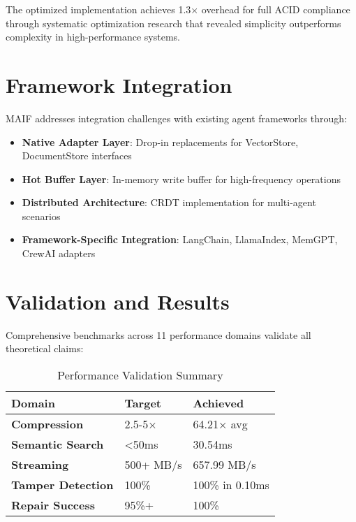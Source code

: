 \documentclass[conference]{IEEEtran}
\begin{document}
The optimized implementation achieves 1.3× overhead for full ACID compliance through systematic optimization research that revealed simplicity outperforms complexity in high-performance systems.

\section{Framework Integration}

MAIF addresses integration challenges with existing agent frameworks through:

\begin{itemize}[leftmargin=*]
\item \textbf{Native Adapter Layer}: Drop-in replacements for VectorStore, DocumentStore interfaces
\item \textbf{Hot Buffer Layer}: In-memory write buffer for high-frequency operations
\item \textbf{Distributed Architecture}: CRDT implementation for multi-agent scenarios
\item \textbf{Framework-Specific Integration}: LangChain, LlamaIndex, MemGPT, CrewAI adapters
\end{itemize}

\section{Validation and Results}

Comprehensive benchmarks across 11 performance domains validate all theoretical claims:

\begin{table}[!t]
\renewcommand{\arraystretch}{1.3}
\caption{Performance Validation Summary}
\label{tab:validation}
\centering
\footnotesize
\begin{tabular}{p{3cm}p{2cm}p{2cm}}
\toprule
\textbf{Domain} & \textbf{Target} & \textbf{Achieved} \\
\midrule
\textbf{Compression} & 2.5-5× & 64.21× avg \\
\textbf{Semantic Search} & <50ms & 30.54ms \\
\textbf{Streaming} & 500+ MB/s & 657.99 MB/s \\
\textbf{Tamper Detection} & 100\% & 100\% in 0.10ms \\
\textbf{Repair Success} & 95\%+ & 100\% \\
\bottomrule
\end{tabular}
\end{table}
\end{document}
